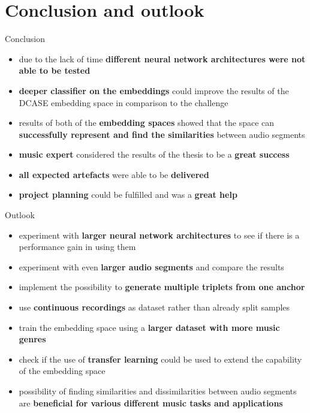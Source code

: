 \documentclass[aspectratio=169, professionalfonts]{beamer}
\begin{document}
\section{Conclusion and outlook}

\begin{frame}{Conclusion}
    \begin{itemize}
		\item due to the lack of time \textbf{different neural network architectures were not able to be tested}
		\item \textbf{deeper classifier on the embeddings} could improve the results of the DCASE embedding space in comparison to the challenge
		\item results of both of the \textbf{embedding spaces} showed that the space can \textbf{successfully represent and find the similarities} between audio segments
		\item \textbf{music expert} considered the results of the thesis to be a \textbf{great success}
		\item \textbf{all expected artefacts} were able to be \textbf{delivered}
		\item \textbf{project planning} could be fulfilled and was a \textbf{great help}
	\end{itemize}
\end{frame}

\begin{frame}{Outlook}
    \begin{itemize}
		\item experiment with \textbf{larger neural network architectures} to see if there is a performance gain in using them
		\item experiment with even \textbf{larger audio segments} and compare the results 
		\item implement the possibility to \textbf{generate multiple triplets from one anchor}
		\item use \textbf{continuous recordings} as dataset rather than already split samples
		\item train the embedding space using a \textbf{larger dataset with more music genres}
		\item check if the use of \textbf{transfer learning} could be used to extend the capability of the embedding space
		\item possibility of finding similarities and dissimilarities between audio segments are \textbf{beneficial for various different music tasks and applications}
	\end{itemize}
\end{frame}
\end{document}
